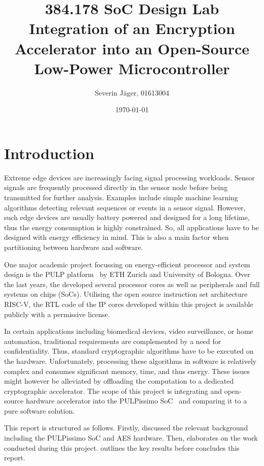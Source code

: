 \documentclass[a4paper, 12pt]{article}
\title{384.178 SoC Design Lab\\
	   Integration of an Encryption Accelerator
	   into an Open-Source Low-Power Microcontroller}
\author{
  Severin Jäger, 01613004
}
\date{\today}
\begin{document}
\maketitle
\tableofcontents
\pagebreak

\section{Introduction} \label{sec:intro}

Extreme edge devices are increasingly facing signal processing workloads. Sensor signals are frequently processed directly in the sensor node before being transmitted for further analysis. Examples include simple machine learning algorithms detecting relevant sequences or events in a sensor signal. However, such edge devices are usually battery powered and designed for a long lifetime, thus the energy consumption is highly constrained. So, all applications have to be designed with energy efficiency in mind. This is also a main factor when partitioning between hardware and software.

One major academic project focussing on energy-efficient processor and system design is the PULP platform~\cite{pulp} by ETH Zurich and University of Bologna. Over the last years, the developed several processor cores as well as peripherals and full systems on chips (SoCs). Utilising the open source instruction set architecture RISC-V, the RTL code of the IP cores developed within this project is available publicly with a permissive license.

In certain applications including biomedical devices, video surveillance, or home automation, traditional requirements are complemented by a need for confidentiality. Thus, standard cryptographic algorithms have to be executed on the hardware. Unfortunately, processing these algorithms in software is relatively complex and consumes significant memory, time, and thus energy. These issues might however be alleviated by offloading the computation to a dedicated cryptographic accelerator. The scope of this project is integrating and open-source hardware accelerator into the PULPissimo SoC~\cite{Schiavone2018} and comparing it to a pure software solution.

This report is structured as follows. Firstly,  discussed the relevant background including the PULPissimo SoC and AES hardware. Then,  elaborates on the work conducted during this project.  outlines the key results before  concludes this report. 
\end{document}
